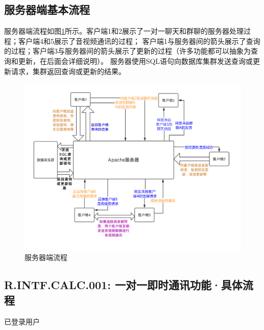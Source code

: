    \subsection{服务器端基本流程}
    服务器端流程如图\ref{fig:server_flow}所示。客户端1和2展示了一对一聊天和群聊的服务器处理过程；客户端4和5展示了音视频通讯的过程；
    客户端1与服务器间的箭头展示了查询的过程；客户端3与服务器间的箭头展示了更新的过程（许多功能都可以抽象为查询和更新，在后面会详细说明）。
    服务器使用SQL语句向数据库集群发送查询或更新请求，集群返回查询或更新的结果。
        \begin{figure}
            \centering
            \includegraphics[scale=0.4]{OutlineDesign/figures/server_flow.png}
            \caption{服务器端流程}
            \label{fig:server_flow}
        \end{figure}
    \subsection{R.INTF.CALC.001: 一对一即时通讯功能·具体流程}
        已登录用户
